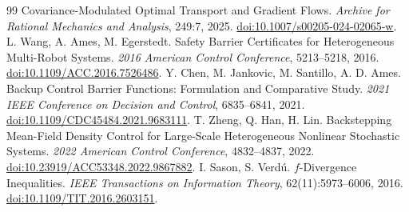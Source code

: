 \documentclass[UTF8,a4paper,11pt,fontset=none]{ctexart}
\begin{document}
\begin{thebibliography}{99}
Covariance-Modulated Optimal Transport and Gradient Flows.
\emph{Archive for Rational Mechanics and Analysis}, 249:7, 2025.
\href{https://doi.org/10.1007/s00205-024-02065-w}{doi:10.1007/s00205-024-02065-w}.
 L. Wang, A. Ames, M. Egerstedt.
Safety Barrier Certificates for Heterogeneous Multi-Robot Systems.
\emph{2016 American Control Conference}, 5213--5218, 2016.
\href{https://doi.org/10.1109/ACC.2016.7526486}{doi:10.1109/ACC.2016.7526486}.
 Y. Chen, M. Jankovic, M. Santillo, A. D. Ames.
Backup Control Barrier Functions: Formulation and Comparative Study.
\emph{2021 IEEE Conference on Decision and Control}, 6835--6841, 2021.
\href{https://doi.org/10.1109/CDC45484.2021.9683111}{doi:10.1109/CDC45484.2021.9683111}.
 T. Zheng, Q. Han, H. Lin.
Backstepping Mean-Field Density Control for Large-Scale Heterogeneous Nonlinear Stochastic Systems.
\emph{2022 American Control Conference}, 4832--4837, 2022.
\href{https://doi.org/10.23919/ACC53348.2022.9867882}{doi:10.23919/ACC53348.2022.9867882}.
 I. Sason, S. Verd\'u.
$f$-Divergence Inequalities.
\emph{IEEE Transactions on Information Theory}, 62(11):5973--6006, 2016.
\href{https://doi.org/10.1109/TIT.2016.2603151}{doi:10.1109/TIT.2016.2603151}.
\end{thebibliography}
\end{document}
